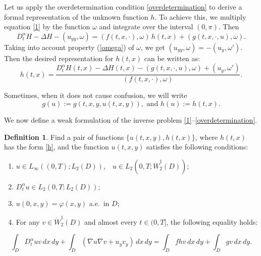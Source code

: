 \documentclass[12pt]{amsart}
\theoremstyle{definition}
\newtheorem{defn}[thm]{Definition}
\numberwithin{equation}{section}
\begin{document}
Let us apply the overdetermination condition \eqref{overdetermination} to derive a formal representation of the unknown function $h$. To achieve this, we multiply equation \eqref{1} by the function $\omega$ and integrate over the interval $(0, \pi)$. Then
\begin{equation*}
    D_t^{\alpha} H - \Delta H - ( u_{yy}, \omega) = (f(t, x, \cdot), \omega) \,h(t, x) + (g(t, x, \cdot, u), \omega).
\end{equation*}
Taking into account  property (\ref{omega}) of $\omega$, we get $(u_{yy}, \omega) = - (u_y,  \omega')$. Then the desired representation for \( h(t, x) \) can be written as:
\begin{equation}\label{h}
h(t, x) = \frac{D_t^{\alpha} H(t, x) -\Delta H(t, x)-(g(t, x, \cdot, u), \omega) + (u_y, \omega')}{(f(t, x, \cdot), \omega)}.
\end{equation}


Sometimes, when it does not cause confusion, we will write 
\begin{equation}\label{g(u)}
  g(u) := g(t, x, y, u(t, x, y)),\,\, \text{and}\,\,   h(u):=  h(t, x). 
\end{equation}







We now define a weak formulation of the inverse problem \eqref{1}–\eqref{overdetermination}.


\begin{defn}\label{opr1} 
Find a pair of functions \( \{ u(t, x, y), h(t, x) \} \), where \( h(t, x) \) has the form \eqref{h}, and the function \( u(t, x, y) \) satisfies the following conditions:
\begin{enumerate}
    \item \( u \in L_\infty((0, T); L_2(D)) \), \,\, \( u \in L_2(0, T; \dot{W}_2^1(D)) \);
    \item \( D_t^\alpha u \in L_2(0, T; L_2(D)) \);
    \item \( u(0, x, y) = \varphi(x, y) \) a.e.\ in \(D \);
    \item For any \( v \in \dot{W}_2^1(D) \) and almost every \( t \in (0, T] \), the following equality holds:
\end{enumerate}
\begin{equation}\label{equation_main}
    \int_D D_t^\alpha u v \, dx \, dy + \int_D (\nabla u \nabla v + u_y v_y) \, dx \, dy = \int_D f h v \, dx \, dy + \int_D g v \, dx \, dy.
\end{equation}
\end{defn}
\end{document}
